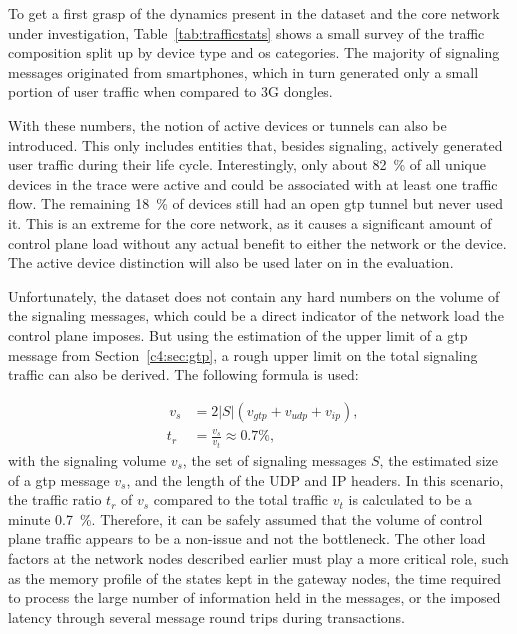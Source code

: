 To get a first grasp of the dynamics present in the dataset and the core network under investigation, Table~\ref{tab:trafficstats} shows a small survey of the traffic composition split up by device type and \gls{os} categories. The majority of signaling messages originated from smartphones, which in turn generated only a small portion of user traffic when compared to \gls{3G} dongles.

With these numbers, the notion of active devices or tunnels can also be introduced. This only includes entities that, besides signaling, actively generated user traffic during their life cycle. Interestingly, only about \SI{82}{\percent} of all unique devices in the trace were active and could be associated with at least one traffic flow. The remaining \SI{18}{\percent} of devices still had an open \gls{gtp} tunnel but never used it. This is an extreme for the core network, as it causes a significant amount of control plane load without any actual benefit to either the network or the device. The active device distinction will also be used later on in the evaluation.

Unfortunately, the dataset does not contain any hard numbers on the volume of the signaling messages, which could be a direct indicator of the network load the control plane imposes. But using the estimation of the upper limit of a \gls{gtp} message from Section~\ref{c4:sec:gtp}, a rough upper limit on the total signaling traffic can also be derived. The following formula is used:

\begin{align}
	\phantom{,}v_s &= 2\left|S\right|(v_{gtp} + v_{udp} + v_{ip})\text{,}\\
	\phantom{.}t_r &= \frac{v_s}{v_t} \approx 0.7\si{\percent}\text{,}
\end{align}
%
with the signaling volume $v_s$, the set of signaling messages $S$, the estimated size of a \gls{gtp} message $v_s$, and the length of the \gls{UDP} and \gls{IP} headers. In this scenario, the traffic ratio $t_r$ of $v_s$ compared to the total traffic $v_t$ is calculated to be a minute \SI{0.7}{\percent}. Therefore, it can be safely assumed that the volume of control plane traffic appears to be a non-issue and not the bottleneck. The other load factors at the network nodes described earlier must play a more critical role, such as the memory profile of the states kept in the gateway nodes, the time required to process the large number of information held in the messages, or the imposed latency through several message round trips during transactions.

